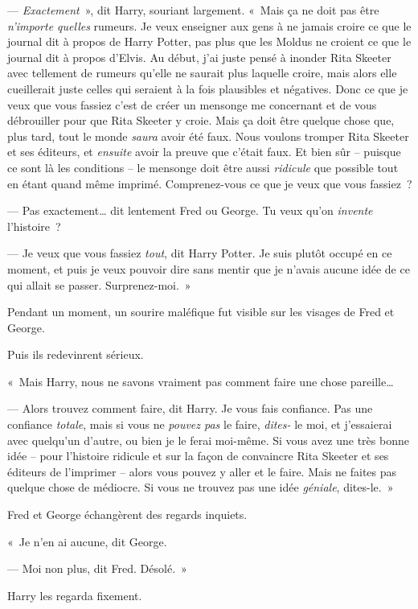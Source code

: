 --- \emph{Exactement}~», dit Harry, souriant largement.
«~Mais ça ne doit pas être \emph{n'importe quelles} rumeurs.
Je veux enseigner aux gens à ne jamais croire ce que le journal dit à propos de Harry Potter, pas plus que les Moldus ne croient ce que le journal dit à propos d'Elvis.
Au début, j'ai juste pensé à inonder Rita Skeeter avec tellement de rumeurs qu'elle ne saurait plus laquelle croire, mais alors elle cueillerait juste celles qui seraient à la fois plausibles et négatives.
Donc ce que je veux que vous fassiez c'est de créer un mensonge me concernant et de vous débrouiller pour que Rita Skeeter y croie.
Mais ça doit être quelque chose que, plus tard, tout le monde \emph{saura} avoir été faux.
Nous voulons tromper Rita Skeeter et ses éditeurs, et \emph{ensuite} avoir la preuve que c'était faux.
Et bien sûr -- puisque ce sont là les conditions -- le mensonge doit être aussi \emph{ridicule} que possible tout en étant quand même imprimé.
Comprenez-vous ce que je veux que vous fassiez~?

--- Pas exactement… dit lentement Fred ou George.
Tu veux qu'on \emph{invente} l'histoire~?

--- Je veux que vous fassiez \emph{tout}, dit Harry Potter.
Je suis plutôt occupé en ce moment, et puis je veux pouvoir dire sans mentir que je n'avais aucune idée de ce qui allait se passer.
Surprenez-moi.~»

Pendant un moment, un sourire maléfique fut visible sur les visages de Fred et George.

Puis ils redevinrent sérieux.

«~Mais Harry, nous ne savons vraiment pas comment faire une chose pareille…

--- Alors trouvez comment faire, dit Harry.
Je vous fais confiance.
Pas une confiance \emph{totale}, mais si vous ne \emph{pouvez pas} le faire, \emph{dites-} le moi, et j'essaierai avec quelqu'un d'autre, ou bien je le ferai moi-même.
Si vous avez une très bonne idée -- pour l'histoire ridicule et sur la façon de convaincre Rita Skeeter et ses éditeurs de l'imprimer -- alors vous pouvez y aller et le faire.
Mais ne faites pas quelque chose de médiocre.
Si vous ne trouvez pas une idée \emph{géniale}, dites-le.~»

Fred et George échangèrent des regards inquiets.

«~Je n'en ai aucune, dit George.

--- Moi non plus, dit Fred.
Désolé.~»

Harry les regarda fixement.

